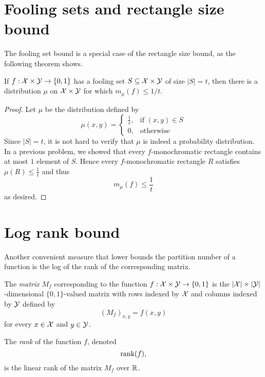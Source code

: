 \newpage \section{Fooling sets and rectangle size bound}

The fooling set bound is a special case of the rectangle size bound, as the following theorem shows.

\begin{theorem}
If $f : \mathcal{X} \times \mathcal{Y} \to \{0,1\}$ has a fooling set $S \subseteq \mathcal{X} \times \mathcal{Y}$ of size $|S| = t$, then there is a distribution $\mu$ on $\mathcal{X} \times \mathcal{Y}$ for which $m_\mu(f) \le 1/t$.
\end{theorem}

\begin{proof}
Let $\mu$ be the distribution defined by 
$$\mu(x,y) = \begin{cases}
\frac{1}{t}, &\text{if } (x,y) \in S \\
0, &\text{otherwise}
\end{cases}$$
Since $|S| = t$, it is not hard to verify that $\mu$ is indeed a probability distribution. In a previous problem, we showed that every $f$-monochromatic rectangle contains at most $1$ element of $S$. Hence every $f$-monochromatic rectangle $R$ satisfies $\mu(R) \leq \frac{1}{t}$ and thus
$$m_\mu(f) \leq\frac{1}{t}$$
as desired.
\end{proof}


\newpage \section{Log rank bound}

Another convenient measure that lower bounds the partition number of a function is the log of the rank of the corresponding matrix.

\begin{definition}
The \emph{matrix} $M_f$ corresponding to the function $f : \mathcal{X} \times \mathcal{Y} \to \{0,1\}$ is the $|\mathcal{X}| \times |\mathcal{Y}|$-dimensional $\{0,1\}$-valued matrix with rows indexed by $\mathcal{X}$ and columns indexed by $\mathcal{Y}$ defined by
\[
(M_f)_{x,y} = f(x,y)
\]
for every $x \in \mathcal{X}$ and $y \in \mathcal{Y}$.
\end{definition}

\begin{definition}[Rank]
The \emph{rank} of the function $f$, denoted
\[
\mathrm{rank}(f),
\] 
is the linear rank of the matrix $M_f$ over $\mathbb{R}$.
\end{definition}

